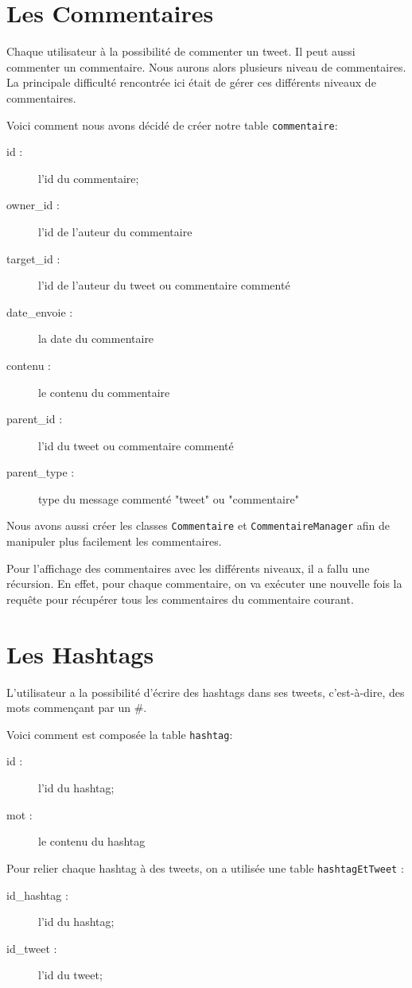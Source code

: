 \documentclass[a4paper, 12pt]{article}
\begin{document}
\section{Les Commentaires}	
Chaque utilisateur à la possibilité de commenter un tweet. Il peut aussi commenter un commentaire. Nous aurons alors plusieurs niveau de commentaires. La principale difficulté rencontrée ici était de gérer ces différents niveaux de commentaires.

Voici comment nous avons décidé de créer notre table \texttt{commentaire}:
\begin{description}
\item[id :] l'id du commentaire;
\item[owner\_id :] l'id de l'auteur du commentaire
\item[target\_id :] l'id de l'auteur du tweet ou commentaire commenté
\item[date\_envoie :] la date du commentaire
\item[contenu :] le contenu du commentaire
\item[parent\_id :] l'id du tweet ou commentaire commenté
\item[parent\_type :] type du message commenté "tweet" ou "commentaire"
\end{description}
Nous avons aussi créer les classes \texttt{Commentaire} et \texttt{CommentaireManager} afin de manipuler plus facilement les commentaires.

Pour l'affichage des commentaires avec les différents niveaux, il a fallu une récursion. En effet, pour chaque commentaire, on va exécuter une nouvelle fois la requête pour récupérer tous les commentaires du commentaire courant.

\newpage
\section{Les Hashtags}		
L'utilisateur a la possibilité d'écrire des hashtags dans ses tweets, c'est-à-dire, des mots commençant par un \#. 

Voici comment est composée la table \texttt{hashtag}:
\begin{description}
\item[id :] l'id du hashtag;
\item[mot :] le contenu du hashtag
\end{description}
Pour relier chaque hashtag à des tweets, on a utilisée une table \texttt{hashtagEtTweet} : 
\begin{description}
\item[id\_hashtag :] l'id du hashtag;
\item[id\_tweet :] l'id du tweet;
\end{description}
\end{document}

